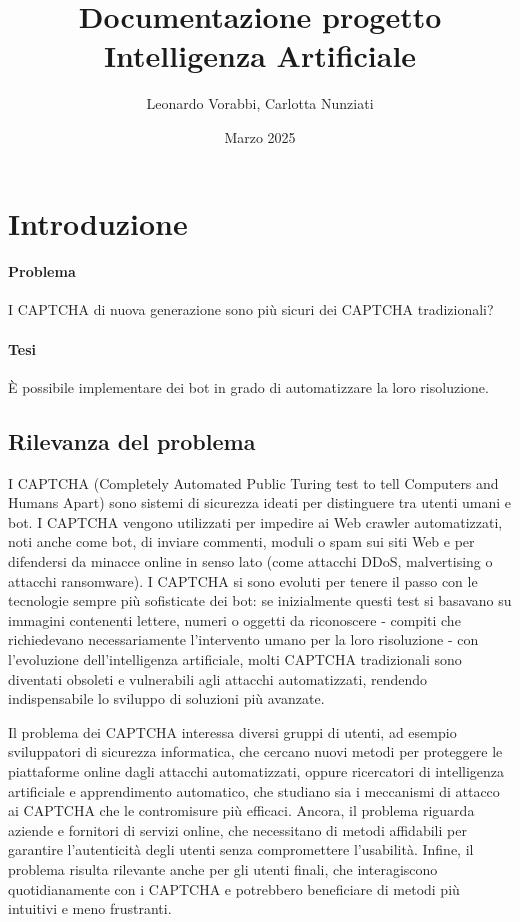 \documentclass{article}
\title{Documentazione progetto Intelligenza Artificiale}
\author{Leonardo Vorabbi, Carlotta Nunziati}
\date{Marzo 2025}
\begin{document}
\maketitle

\section{Introduzione}
\paragraph{Problema} I CAPTCHA di nuova generazione sono più sicuri dei CAPTCHA tradizionali?

\paragraph{Tesi} È possibile implementare dei bot in grado di automatizzare la loro risoluzione.

\subsection{Rilevanza del problema} I CAPTCHA (Completely Automated Public Turing test to tell Computers and Humans Apart) sono sistemi di sicurezza ideati per distinguere tra utenti umani e bot. I CAPTCHA vengono utilizzati per impedire ai Web crawler automatizzati, noti anche come bot, di inviare commenti, moduli o spam sui siti Web e per difendersi da minacce online in senso lato (come attacchi DDoS, malvertising o attacchi ransomware). I CAPTCHA si sono evoluti per tenere il passo con le tecnologie sempre più sofisticate dei bot: se inizialmente questi test si basavano su immagini contenenti lettere, numeri o oggetti da riconoscere - compiti che richiedevano necessariamente l'intervento umano per la loro risoluzione - con l'evoluzione dell'intelligenza artificiale, molti CAPTCHA tradizionali sono diventati obsoleti e vulnerabili agli attacchi automatizzati, rendendo indispensabile lo sviluppo di soluzioni più avanzate. 

Il problema dei CAPTCHA interessa diversi gruppi di utenti, ad esempio sviluppatori di sicurezza informatica, che cercano nuovi metodi per proteggere le piattaforme online dagli attacchi automatizzati, oppure ricercatori di intelligenza artificiale e apprendimento automatico, che studiano sia i meccanismi di attacco ai CAPTCHA che le contromisure più efficaci. Ancora, il problema riguarda aziende e fornitori di servizi online, che necessitano di metodi affidabili per garantire l'autenticità degli utenti senza compromettere l'usabilità. Infine, il problema risulta rilevante anche per gli utenti finali, che interagiscono quotidianamente con i CAPTCHA e potrebbero beneficiare di metodi più intuitivi e meno frustranti.
\end{document}
